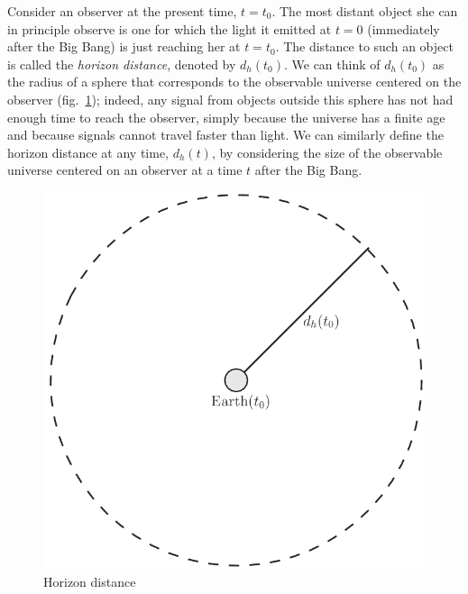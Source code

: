 \documentclass[11pt, a4paper,oneside,openright]{book}
\numberwithin{equation}{section}
\begin{document}
Consider an observer at the present time, $t=t_0$. The most distant object she can in principle observe is one for which the light it emitted at $t=0$ (immediately after the Big Bang) is just reaching her at $t=t_0$. The distance to such an object is called the {\it horizon distance}, denoted by $d_h(t_0)$. We can think of $d_h(t_0)$ as the radius of a sphere that corresponds to the observable universe centered on the observer (fig.\ \ref{fig:lec12_2}); indeed, any signal from objects outside this sphere has not had enough time to reach the observer, simply because the universe has a finite age and because signals cannot travel faster than light. We can similarly define the horizon distance at any time, $d_h(t)$, by considering the size of the observable universe centered on an observer at a time $t$ after the Big Bang.
\begin{figure}[ht]
\begin{center}
\includegraphics[scale=0.4]{Draw/lec12_2.png}
\end{center}
\caption{Horizon distance}
\label{fig:lec12_2}
\end{figure}
\end{document}
